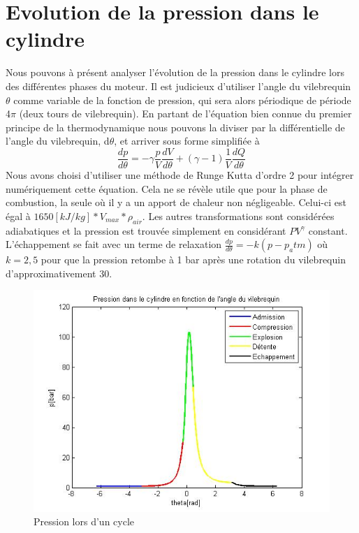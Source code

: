 \documentclass[a4paper,oneside,12pt]{report}
\begin{document}
\section{Evolution de la pression dans le cylindre}

Nous pouvons à présent analyser l'évolution de la pression dans le cylindre lors des différentes phases du moteur. Il est judicieux d'utiliser l'angle du vilebrequin $\theta$ comme variable de la fonction de pression, qui sera alors périodique de période 4$\pi$ (deux tours de vilebrequin). En partant de l'équation bien connue du premier principe de la thermodynamique nous pouvons la diviser par la différentielle de l'angle du vilebrequin, d$\theta$, et arriver sous forme simplifiée à
$$\frac{dp}{d\theta}=-\gamma\frac{p}{V}\frac{dV}{d\theta}+(\gamma - 1) \frac{1}{V}\frac{dQ}{d\theta}$$
Nous avons choisi d'utiliser une méthode de Runge Kutta d'ordre 2 pour intégrer numériquement cette équation. Cela ne se révèle utile que pour la phase de combustion, la seule où il y a un apport de chaleur non négligeable. Celui-ci est égal à $1650[kJ/kg] * V_{max} * \rho_{air}$. Les autres transformations sont considérées adiabatiques et la pression est trouvée simplement en considérant $PV^{\gamma}$ constant. L'échappement se fait avec un terme de relaxation $\frac{dp}{d\theta}=-k(p-p_atm)$ où $k=2,5$ pour que la pression retombe à 1 bar après une rotation du vilebrequin d'approximativement 30\degre.

\begin{figure}[H]
	\center
	\includegraphics[scale=0.75]{pression.jpg}
	\caption{Pression lors d'un cycle}
\end{figure}
\end{document}
